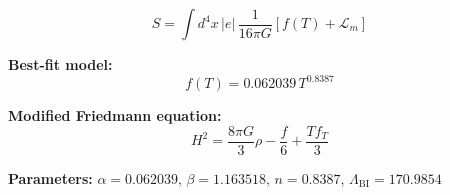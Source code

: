 
\begin{equation}
  S = \int d^4x \, |e| \, \frac{1}{16\pi G} \left[ f(T) + \mathcal{L}_m \right]
\end{equation}

\textbf{Best-fit model:}
\begin{equation}
  f(T) = 0.062039 \, T^{0.8387}
\end{equation}

\textbf{Modified Friedmann equation:}
\begin{equation}
  H^2 = \frac{8\pi G}{3} \rho - \frac{f}{6} + \frac{T f_T}{3}
\end{equation}

\textbf{Parameters:}
$\alpha = 0.062039$, \quad
$\beta = 1.163518$, \quad
$n = 0.8387$, \quad
$\Lambda_{\text{BI}} = 170.9854$